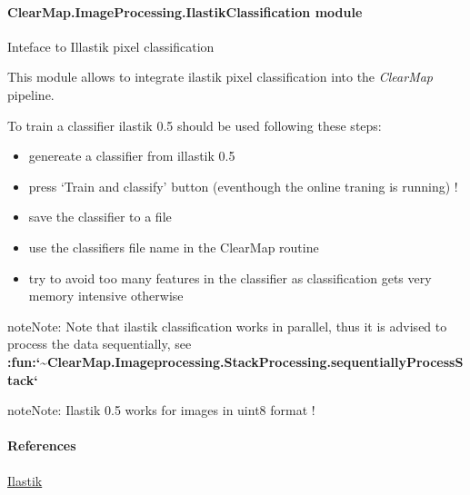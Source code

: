 \documentclass[letterpaper,10pt,english]{sphinxmanual}
\begin{document}
\paragraph{ClearMap.ImageProcessing.IlastikClassification module}
\label{api/ClearMap.ImageProcessing:module-ClearMap.ImageProcessing.IlastikClassification}\label{api/ClearMap.ImageProcessing:clearmap-imageprocessing-ilastikclassification-module}
Inteface to Illastik pixel classification

This module allows to integrate ilastik pixel classification into the \emph{ClearMap}
pipeline.

To train a classifier ilastik 0.5 should be used following these steps:
\begin{itemize}
\item {} 
genereate a classifier from illastik 0.5

\item {} 
press `Train and classify' button (eventhough the online traning is running) !

\item {} 
save the classifier to a file

\item {} 
use the classifiers file name in the ClearMap routine {\hyperref[api/ClearMap.ImageProcessing:ClearMap.ImageProcessing.IlastikClassification.classifyPixel]{\emph{}}}

\item {} 
try to avoid too many features in the classifier
as classification gets very memory intensive otherwise

\end{itemize}

\begin{notice}{note}{Note:}
Note that ilastik classification works in parallel, thus it is advised to
process the data sequentially, see
{\color{red}\bfseries{}:fun:{}`\textasciitilde{}ClearMap.Imageprocessing.StackProcessing.sequentiallyProcessStack{}`}
\end{notice}

\begin{notice}{note}{Note:}
Ilastik 0.5 works for images in uint8 format !
\end{notice}
\paragraph{References}

\href{http://ilastik.org/}{Ilastik}
\end{document}
